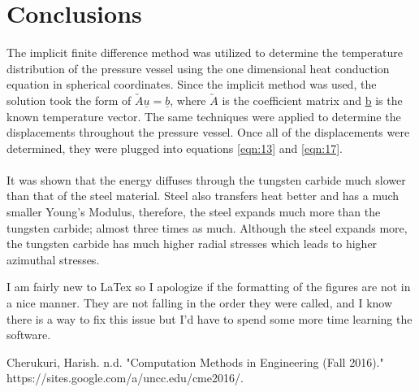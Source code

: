 \documentclass[times]{nmeauth}
\begin{document}
\section{Conclusions}
\vspace{-2pt}

The implicit finite difference method was utilized to determine the temperature distribution of the pressure vessel using the one dimensional heat conduction equation in spherical coordinates. Since the implicit method was used, the solution took the form of $\utilde{A}\underline{u} = \underline{b}$, where $\utilde{A}$ is the coefficient matrix and \underline{b} is the known temperature vector. The same techniques were applied to determine the displacements throughout the pressure vessel. Once all of the displacements were determined, they were plugged into equations \eqref{eqn:13} and \eqref{eqn:17}.\\
\\
It was shown that the energy diffuses through the tungsten carbide much slower than that of the steel material. Steel also transfers heat better and has a much smaller Young's Modulus, therefore, the steel expands much more than the tungsten carbide; almost three times as much. Although the steel expands more, the tungsten carbide has much higher radial stresses which leads to higher azimuthal stresses. 

\ack I am fairly new to LaTex so I apologize if the formatting of the figures are not in a nice manner. They are not falling in the order they were called, and I know there is a way to fix this issue but I'd have to spend some more time learning the software.\\

\begin{thebibliography}{9}
 Cherukuri, Harish. n.d. "Computation Methods in Engineering (Fall 2016)." https://sites.google.com/a/uncc.edu/cme2016/.
\end{thebibliography}
\end{document}
